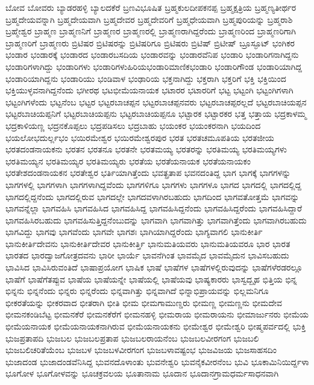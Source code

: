 {ಬೋವ
ಬೋವರು
ಬ್ಯಾಡರಹಳ್ಳಿ
ಬ್ಯಾಲದಕೆರೆ
ಬ್ರಣವಿಭೂಷಿತ
ಬ್ರಹ್ಮಕುಲದೀಪಕನಪ್ಪ
ಬ್ರಹ್ಮಕ್ಷತ್ರಿಯ
ಬ್ರಹ್ಮಣ್ಯತೀರ್ಥರ
ಬ್ರಹ್ಮದೇಯವನ್ನಾಗಿ
ಬ್ರಹ್ಮದೇಯವಾಗಿ
ಬ್ರಹ್ಮದೇವರ
ಬ್ರಹ್ಮದೇವರಿಗೆ
ಬ್ರಹ್ಮಧೇಯವಾಗಿ
ಬ್ರಹ್ಮಪುರಿಯನ್ನು
ಬ್ರಹ್ಮರಾಶಿ
ಬ್ರಹ್ಮೇಶ್ವರ
ಬ್ರಾಹ್ಮಣ
ಬ್ರಾಹ್ಮಣನಿಗೆ
ಬ್ರಾಹ್ಮಣರ
ಬ್ರಾಹ್ಮಣರಲ್ಲಿ
ಬ್ರಾಹ್ಮಣರಾಗಿದ್ದರೆಂದು
ಬ್ರಾಹ್ಮಣರಿಂದ
ಬ್ರಾಹ್ಮಣರಿಗಾಗಿ
ಬ್ರಾಹ್ಮಣರಿಗೆ
ಬ್ರಾಹ್ಮಣರು
ಬ್ರಿಟಿಷರ
ಬ್ರಿಟಿಷರನ್ನು
ಬ್ರಿಟಿಷರಿಗೂ
ಬ್ರಿಟಿಷರು
ಬ್ರಿಟಿಷ್
ಬ್ರಿಟೀಷ್
ಬ್ರೂಸ್ಫೂಟ್
ಭಂಗಿಕರ
ಭಂಡಾರ
ಭಂಡಾರಕ್ಕೆ
ಭಂಡಾರದ
ಭಂಡಾರಬಸದಿಯ
ಭಂಡಾರವನ್ನು
ಭಂಡಾರವೆನಿಪ
ಭಂಡಾರಿ
ಭಂಡಾರಿಗನಾಗಿದ್ದನು
ಭಂಡಾರಿಗಳಾಗಿದ್ದು
ಭಂಡಾರಿಗಳು
ಭಂಡಾರಿಗಳುಹಿರಿಯಭಂಡಾರಿಮಾಣಿಕಭಂಡಾರಿ
ಭಂಡಾರಿಗೌಂಡ
ಭಂಡಾರಿಯಾಗಿದ್ದ
ಭಂಡಾರಿಯಾಗಿದ್ದನು
ಭಂಡಾರಿಯು
ಭಂಡಿವಾಳ
ಭಂಢಾರಿಯ
ಭಕ್ತನಾಗಿದ್ದು
ಭಕ್ತರಾಗಿ
ಭಕ್ತರಿಗೆ
ಭಕ್ತಿ
ಭಕ್ತಿಯಿಂದ
ಭಕ್ತಿಯುಳ್ಳವನಾಗಿದ್ದನೆಂದು
ಭಗೀರಥ
ಭಟಭೀಮೆಯನಾಯಕ
ಭಟಾರರ
ಭಟಾರರಿಗೆ
ಭಟ್ಟ
ಭಟ್ಟಂಗಿ
ಭಟ್ಟಂಗಿಗಳಾಗಿ
ಭಟ್ಟಂಗಿಗಳೆಂದು
ಭಟ್ಟನೆಂಬ
ಭಟ್ಟರ
ಭಟ್ಟರಬಾಚಪ್ಪನ
ಭಟ್ಟರಬಾಚಪ್ಪನವರು
ಭಟ್ಟರಬಾಚಪ್ಪರಲ್ಲದೆ
ಭಟ್ಟರಬಾಚಿಯಪ್ಪನ
ಭಟ್ಟರಬಾಚಿಯಪ್ಪನಿಗೆ
ಭಟ್ಟರಬಾಚಿಯಪ್ಪನು
ಭಟ್ಟರಬಾಚಿಯಪ್ಪನೂ
ಭಟ್ಟಾರಕ
ಭಟ್ಟಾರಕರ
ಭತ್ತ
ಭತ್ತಾಯ
ಭದ್ರಕಾಳಮ್ಮ
ಭದ್ರಕಾಳಿಯಣ್ಣ
ಭದ್ರನಕೊಪ್ಪಲು
ಭದ್ರಪಡಿಸಲು
ಭದ್ರಬಾಹು
ಭಯಂಕರ
ಭಯಂಕರನಾಗಿ
ಭಯದಿಂದ
ಭಯಲೋಭದುರ್ಲ್ಲಭಂ
ಭಯಿರಮೇಶ್ವರ
ಭಯಿರಮೇಶ್ವರಪುರ
ಭರತ
ಭರತಚಮೂಪತಿಯ
ಭರತಜೀಯ
ಭರತದಂಡನಾಯಕನು
ಭರತನ
ಭರತನೂ
ಭರತನೇ
ಭರತಮಯ್ಯ
ಭರತರನ್ನು
ಭರತಿಮಯ್ಯ
ಭರತಿಮಯ್ಯಗಳು
ಭರತಿಮಯ್ಯನ
ಭರತಿಮಯ್ಯರ
ಭರತಿಮಯ್ಯರು
ಭರತೆಯ
ಭರತೆಯನಾಯಕ
ಭರತೆಯನಾಯಕಂ
ಭರತೇಶದಂಡನಾಯಕನ
ಭರತೇಶ್ವರ
ಭರ್ತಿಯಾಗಿತ್ತೆಂದು
ಭವತ್ಪ್ರತಾಪ
ಭವನದಂತಿದ್ದ
ಭಾಗ
ಭಾಗಕ್ಕೆ
ಭಾಗಗಳನ್ನು
ಭಾಗಗಳಲ್ಲಿ
ಭಾಗಗಳಾಗಿ
ಭಾಗಗಳಾಗಿದ್ದವೆಂದು
ಭಾಗಗಳಿಗೂ
ಭಾಗಗಳು
ಭಾಗಗಳೂ
ಭಾಗದ
ಭಾಗದಲ್ಲಿ
ಭಾಗದಲ್ಲಿದ್ದ
ಭಾಗದಲ್ಲಿದ್ದನೆಂದು
ಭಾಗದಲ್ಲಿರುವ
ಭಾಗದಲ್ಲೇ
ಭಾಗದವಳಾಗಿರಬಹುದು
ಭಾಗದಿಂದ
ಭಾಗವತೋತ್ತಮೆ
ಭಾಗವನ್ನು
ಭಾಗವನ್ನೆಲ್ಲಾ
ಭಾಗವಹಿಸಿ
ಭಾಗವಹಿಸಿದ
ಭಾಗವಹಿಸಿದ್ದ
ಭಾಗವಹಿಸಿದ್ದನೆಂದು
ಭಾಗವಹಿಸಿದ್ದರೆಂದು
ಭಾಗವಹಿಸಿದ್ದಾರೆ
ಭಾಗವಹಿಸಿರಬಹುದು
ಭಾಗವಹಿಸುತ್ತಿದ್ದನೆಂಬುದನ್ನು
ಭಾಗವಾಗಿ
ಭಾಗವಾಗಿತ್ತು
ಭಾಗವಾಗಿತ್ತೆಂದು
ಭಾಗವಾಗಿರಬಹುದು
ಭಾಗವಿದ್ದು
ಭಾಗವು
ಭಾಗವೆಂದು
ಭಾಗವೇ
ಭಾಗಶಃ
ಭಾಗಿಯಾಗಿದ್ದರೆಂದು
ಭಾಗ್ಯವಾಗಲಿ
ಭಾನುಕೀರ್ತಿ
ಭಾನುಕೀರ್ತಿದೇವನು
ಭಾನುಕೀರ್ತಿದೇವರ
ಭಾನುಕೀರ್ತ್ತಿ
ಭಾನುಮತಿಯವರು
ಭಾನುಮತಿಯವರೂ
ಭಾರ
ಭಾರತ
ಭಾರತದ
ಭಾರದ್ವಾಜಗೋತ್ರದವನು
ಭಾರೀ
ಭಾರ್ಯೆ
ಭಾವನೆಗಿಂತ
ಭಾವಮೈದ
ಭಾವಮೈದುನ
ಭಾವಿಸಬಹುದು
ಭಾವಿಸಿದ
ಭಾವಿಸಿರುವಂತಿದೆ
ಭಾಷಾಪ್ರಯೋಗ
ಭಾಷಿಕ
ಭಾಷೆ
ಭಾಷೆಗಳ
ಭಾಷೆಗಳಲ್ಲಿರುವುದನ್ನು
ಭಾಷೆಗಳೆರಡರಲ್ಲೂ
ಭಾಷೆಗೆ
ಭಾಷೆಗೆತಪ್ಪುವ
ಭಾಷೆಯ
ಭಾಷೆಯನ್ನೇ
ಭಾಷೆಯಲ್ಲಿ
ಭಾಷೆಯವು
ಭಾಷ್ಯಕಾರರು
ಭಾಸ್ವದ್ಬೃಹ
ಭಿತ್ತಿಯ
ಭಿನ್ನ
ಭಿನ್ನನು
ಭಿನ್ನನೆಂದು
ಭಿನ್ನರು
ಭಿನ್ನರೆಂದು
ಭಿನ್ನವಾಗಿತ್ತು
ಭಿನ್ನವಾಗಿದೆ
ಭಿನ್ನಾಭಿಪ್ರಾಯವನ್ನು
ಭಿಲ್ಲಮನಿಗೂ
ಭೀಕರತೆಯನ್ನು
ಭೀಕರವಾದ
ಭೀತರಾಗಿ
ಭೀತಿ
ಭೀಮ
ಭೀಮಗಾಮುಣ್ಡರು
ಭೀಮಣ್ಣ
ಭೀಮಣ್ಣನು
ಭೀಮದೇವ
ಭೀಮನಕಂಡಿಬೆಟ್ಟ
ಭೀಮನಕೆರೆ
ಭೀಮನಕೆರೆಗೆ
ಭೀಮನಹಳ್ಳಿ
ಭೀಮರಾಯ
ಭೀಮರಾಯನು
ಭೀಮಾರ್ಜುನರು
ಭೀಮೆಯ
ಭೀಮೆಯನಾಯಕ
ಭೀಮೆಯನಾಯಕನಾಗಿರುವ
ಭೀಮೆಯನಾಯಕನು
ಭೀಮೇಶ್ವರ
ಭೀಮೇಶ್ವರಿ
ಭೀಷ್ಮಪರ್ವದಲ್ಲಿ
ಭುಕ್ತಿ
ಭುಜಪ್ರತಾಪದಿ
ಭುಜಬಲ
ಭುಜಬಲಪ್ರತಾಪ
ಭುಜಬಲರಾಯನೆಂಬ
ಭುಜಬಲವೀರಗಂಗ
ಭುಜಬಲಿ
ಭುಜಬಲಿಚರಿತೆಯೆಂಬ
ಭುಜಬಳ
ಭುಜಬಳವೀರಗಂಗ
ಭುಜಬಳಾವಷ್ಟಂಭ
ಭುಜವಿಜಯ
ಭುಜಸಾಹಸದಿಂ
ಭುಜಾದಂಡ
ಭುಜಾದಂಡವೆನಿಸಿದ್ದ
ಭುವನದೊಳಾಂತು
ಭುವನೇಶ್ವರಿ
ಭುವನೈಕವೀರನೆಂಬ
ಭುವಿ
ಭೂಕಾಮಿನಿಯಿರ್ದ್ದಳಾ
ಭೂಗೋಳ
ಭೂಗೋಳವನ್ನು
ಭೂಚಕ್ರವಲಯ
ಭೂತಾನಾಮ
ಭೂದಾನ
ಭೂದಾನಗ್ರಾಮಧರ್ಮಸಾಧನವಾಗಿ
}
